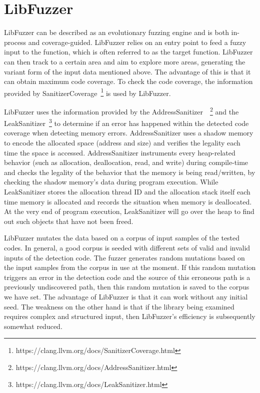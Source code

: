 \documentclass[a4paper,11pt,oneside,openany]{book}
\begin{document}
\section{LibFuzzer}


LibFuzzer can be described as an evolutionary fuzzing engine and is both in-process and coverage-guided. LibFuzzer relies on an entry point to feed a fuzzy input to the function, which is often referred to as the target function. LibFuzzer can then track to a certain area and aim to explore more areas, generating the variant form of the input data mentioned above. The advantage of this is that it can obtain maximum code coverage.  To check the code coverage, the information provided by SanitizerCoverage~\footnote{https://clang.llvm.org/docs/SanitizerCoverage.html} is used by LibFuzzer.

LibFuzzer uses the information provided by the AddressSanitizer~\cite{asan}~\footnote{https://clang.llvm.org/docs/AddressSanitizer.html} and the LeakSanitizer~\footnote{https://clang.llvm.org/docs/LeakSanitizer.html} to determine if an error has happened within the detected code coverage when detecting memory errors. AddressSanitizer uses a shadow memory to encode the allocated space (address and size) and verifies the legality each time the space is accessed. AddressSanitizer instruments every heap-related behavior (such as allocation, deallocation, read, and write) during compile-time and checks the legality of the behavior that the memory is being read/written, by checking the shadow memory's data during program execution. While LeakSanitizer stores the allocation thread ID and the allocation stack itself each time memory is allocated and records the situation when memory is deallocated. At the very end of program execution, LeakSanitizer will go over the heap to find out such objects that have not been freed.

LibFuzzer mutates the data based on a corpus of input samples of the tested codes. In general, a good corpus is seeded with different sets of valid and invalid inputs of the detection code. The fuzzer generates random mutations based on the input samples from the corpus in use at the moment. If this random mutation triggers an error in the detection code and the source of this erroneous path is a previously undiscovered path, then this random mutation is saved to the corpus we have set. The advantage of LibFuzzer is that it can work without any initial seed. The weakness on the other hand is that if the library being examined requires complex and structured input, then LibFuzzer's efficiency is subsequently somewhat reduced.
\end{document}
